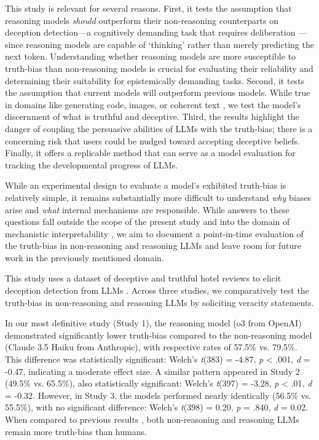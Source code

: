 \documentclass{article}
\begin{document}
This study is relevant for several reasons. First, it tests the assumption that reasoning models \textit{should} outperform their non-reasoning counterparts on deception detection---a cognitively demanding task that requires deliberation \citep{mccornack_deception_1986}---since reasoning models are capable of `thinking' rather than merely predicting the next token. Understanding whether reasoning models are more susceptible to truth-bias than non-reasoning models is crucial for evaluating their reliability and determining their suitability for epistemically demanding tasks. Second, it tests the assumption that current models will outperform previous models. While true in domains like generating code, images, or coherent text \citep{handa2025economictasksperformedai, anthropic_anthropic_2025}, we test the model's discernment of what is truthful and deceptive. Third, the results highlight the danger of coupling the persuasive abilities of LLMs with the truth-bias; there is a concerning risk that users could be nudged toward accepting deceptive beliefs. Finally, it offers a replicable method that can serve as a model evaluation for tracking the developmental progress of LLMs.

While an experimental design to evaluate a model's exhibited truth-bias is relatively simple, it remains substantially more difficult to understand \textit{why} biases arise and \textit{what} internal mechanisms are responsible. While answers to these questions fall outside the scope of the present study and into the domain of mechanistic interpretability \citep{Nanda2023ProgressMF}, we aim to document a point-in-time evaluation of the truth-bias in non-reasoning and reasoning LLMs and leave room for future work in the previously mentioned domain.

This study uses a dataset of deceptive and truthful hotel reviews \citep{ott_finding_2011} to elicit deception detection from LLMs \citep{markowitz_generative_2024}. Across three studies, we comparatively test the truth-bias in non-reasoning and reasoning LLMs by soliciting veracity statements.

In our most definitive study (Study 1), the reasoning model (o3 from OpenAI) demonstrated significantly lower truth-bias compared to the non-reasoning model (Claude 3.5 Haiku from Anthropic), with respective rates of 57.5\% vs. 79.5\%. This difference was statistically significant: Welch's \textit{t}(383) = -4.87, \textit{p} < .001, \textit{d} = -0.47, indicating a moderate effect size. A similar pattern appeared in Study 2 (49.5\% vs. 65.5\%), also statistically significant: Welch's \textit{t}(397) = -3.28, \textit{p} < .01, \textit{d} = -0.32. However, in Study 3, the models performed nearly identically (56.5\% vs. 55.5\%), with no significant difference: Welch's \textit{t}(398) = 0.20, \textit{p} = .840, \textit{d} = 0.02. When compared to previous results \citep{markowitz_generative_2024}, both non-reasoning and reasoning LLMs remain more truth-bias than humans.
\end{document}
